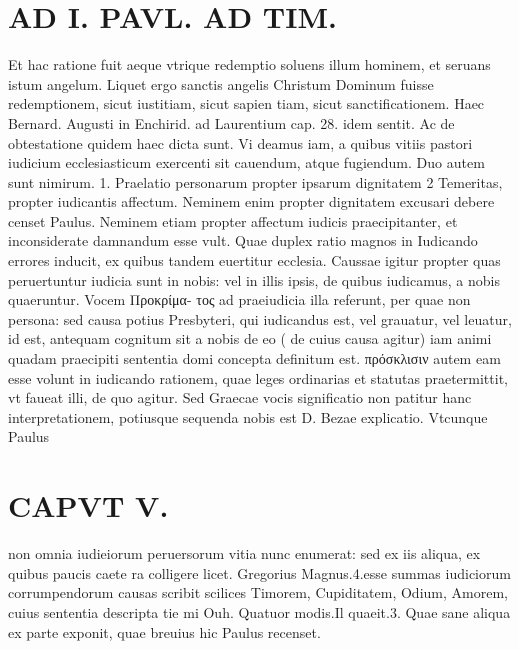 \documentclass{article}
\begin{document}
\begin{pages}
\section*{AD I. PAVL. AD TIM. }
\marginpar{[ p.530 ]}\pstart Et hac ratione fuit aeque vtrique redemptio soluens illum hominem, et seruans istum angelum. Liquet ergo sanctis angelis Christum Dominum fuisse redemptionem, sicut iustitiam, sicut sapien tiam, sicut sanctificationem. Haec Bernard. Augusti in Enchirid. ad Laurentium cap. 28. idem sentit.  \pend\pstart Ac de obtestatione quidem haec dicta sunt. Vi deamus iam, a quibus vitiis pastori iudicium ecclesiasticum exercenti sit cauendum, atque fugiendum.  \pend\pstart Duo autem sunt nimirum. 1. Praelatio personarum propter ipsarum dignitatem 2 Temeritas, propter iudicantis affectum. Neminem enim propter dignitatem excusari debere censet Paulus. Neminem etiam propter affectum iudicis praecipitanter, et inconsiderate damnandum esse vult. Quae duplex ratio magnos in Iudicando errores inducit, ex quibus tandem euertitur ecclesia. Caussae igitur propter quas peruertuntur iudicia sunt in nobis: vel in illis ipsis, de quibus iudicamus, a nobis quaeruntur. Vocem Προκρίμα- τος ad praeiudicia illa referunt, per quae non persona: sed causa potius Presbyteri, qui iudicandus est, vel grauatur, vel leuatur, id est, antequam cognitum sit a nobis de eo ( de cuius causa agitur) iam animi quadam praecipiti sententia domi concepta definitum est. πρόσκλισιν autem eam esse volunt in iudicando rationem, quae leges ordinarias et statutas praetermittit, vt faueat illi, de quo agitur. Sed Graecae vocis significatio non patitur hanc interpretationem, potiusque sequenda nobis est D. Bezae explicatio. Vtcunque Paulus  \pend
\section*{CAPVT  V. }
\marginpar{[ p.337 ]}\pstart non omnia iudieiorum peruersorum vitia nunc enumerat: sed ex iis aliqua, ex quibus paucis caete ra colligere licet. Gregorius Magnus.4.esse summas iudiciorum corrumpendorum causas scribit scilices Timorem, Cupiditatem, Odium, Amorem, cuius sententia descripta tie mi Ouh. Quatuor modis.Il quaeit.3. Quae sane aliqua ex parte exponit, quae breuius hic Paulus recenset.  \pend
{}
{}

\end{pages}
\end{document}
